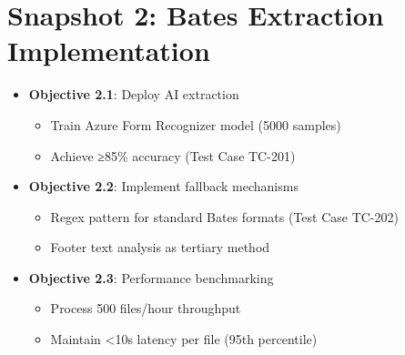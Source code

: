 \documentclass{article}
\begin{document}
\section*{Snapshot 2: Bates Extraction Implementation}
\label{sec:snapshot2}
\begin{itemize}[leftmargin=*]
    \item \textbf{Objective 2.1}: Deploy AI extraction
    \begin{itemize}
        \item Train Azure Form Recognizer model (5000 samples)
        \item Achieve ≥85\% accuracy (Test Case TC-201)
    \end{itemize}
    
    \item \textbf{Objective 2.2}: Implement fallback mechanisms
    \begin{itemize}
        \item Regex pattern for standard Bates formats (Test Case TC-202)
        \item Footer text analysis as tertiary method
    \end{itemize}
    
    \item \textbf{Objective 2.3}: Performance benchmarking
    \begin{itemize}
        \item Process 500 files/hour throughput
        \item Maintain <10s latency per file (95th percentile)
    \end{itemize}
\end{itemize}
\end{document}
